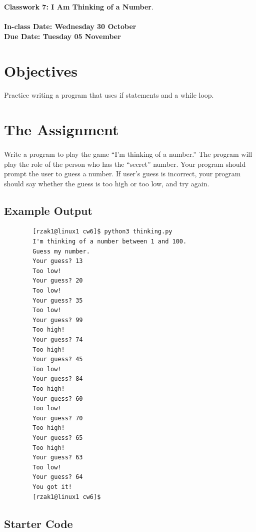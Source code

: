 \documentclass[letter,10pt]{article}
\begin{document}
    
    \huge
    \textbf{Classwork 7: I Am Thinking of a Number}.
    \normalsize
    \\ ~~ \\
    \textbf{In-class Date: Wednesday 30 October} \\
    \textbf{Due Date: Tuesday 05 November}
    
    \section*{Objectives}
    \paragraph{}Practice writing a program that uses if statements and a while loop.
    
    \section*{The Assignment}
    \paragraph{}Write a program to play the game ``I'm thinking of a number.'' The program will play the role of the person who has the ``secret'' number. Your program should prompt the user to guess a number. If user's guess is incorrect, your program should say whether the guess is too high or too low, and try again.
    
    \subsection*{Example Output}
    \begin{verbatim}
        [rzak1@linux1 cw6]$ python3 thinking.py
        I'm thinking of a number between 1 and 100.
        Guess my number.
        Your guess? 13
        Too low!
        Your guess? 20
        Too low!
        Your guess? 35
        Too low!
        Your guess? 99
        Too high!
        Your guess? 74
        Too high!
        Your guess? 45
        Too low!
        Your guess? 84
        Too high!
        Your guess? 60
        Too low!
        Your guess? 70
        Too high!
        Your guess? 65
        Too high!
        Your guess? 63
        Too low!
        Your guess? 64
        You got it!
        [rzak1@linux1 cw6]$ 
    \end{verbatim}
    
    \subsection*{Starter Code}
\end{document}
